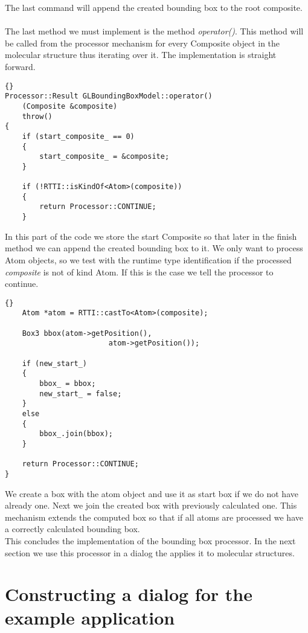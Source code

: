 The last command will append the created bounding box to the root composite.\\ \\

The last method we must implement is the method {\em operator()}. This method
will be called from the processor mechanism for every Composite object
in the molecular structure thus iterating over it.
The implementation is straight forward.

\begin{lstlisting}{}
Processor::Result GLBoundingBoxModel::operator() 
	(Composite &composite)
	throw()
{
	if (start_composite_ == 0)
	{
		start_composite_ = &composite;
	}

	if (!RTTI::isKindOf<Atom>(composite))
	{
		return Processor::CONTINUE;
	}
\end{lstlisting}

In this part of the code we store the start Composite so that later in the finish
method we can append the created bounding box to it.
We only want to process Atom objects, so we test with the runtime type
identification if the processed {\em composite} is not of kind Atom. If this
is the case we tell the processor to continue.

\begin{lstlisting}{}
	Atom *atom = RTTI::castTo<Atom>(composite);

	Box3 bbox(atom->getPosition(), 
						atom->getPosition());

	if (new_start_)
	{
		bbox_ = bbox;
		new_start_ = false;
	}
	else
	{
		bbox_.join(bbox);
	}

	return Processor::CONTINUE;
}
\end{lstlisting}

We create a box with the atom object and use it as start box if we do not have already
one. Next we join the created box with previously calculated one. This mechanism
extends the computed box so that if all atoms are processed we have a correctly calculated
bounding box.\\

This concludes the implementation of the bounding box processor. In the next
section we use this processor in a dialog the applies it to molecular structures.



\section{Constructing a dialog for the example application}
\label{section:construction_of_a_dialog}

